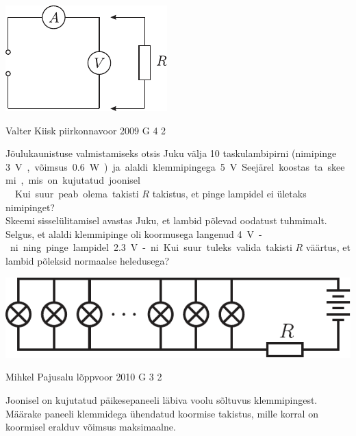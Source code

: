 \documentclass[11pt]{article}
\begin{document}
{{\begin{center}
	\includegraphics[width=0.5\linewidth]{2006-v3g-01-yl}
\end{center}
\fi
}

{Valter Kiisk} %
{piirkonnavoor} %
{2009} %
{G 4} %
{2} %
{
\ifStatement
Jõulukaunistuse valmistamiseks otsis Juku välja 10
taskulambipirni (nimipinge \SI{3}V, võimsus \SI{0.6}W) ja alaldi klemmipingega \SI{5}V.
Seejärel koostas ta skeemi, mis on kujutatud joonisel.\\
\osa Kui suur peab olema
takisti $R$ takistus, et pinge lampidel ei ületaks nimipinget?\\
\osa Skeemi sisselülitamisel avastas Juku, et lambid põlevad oodatust tuhmimalt. Selgus, et alaldi
klemmipinge oli koormusega langenud \SI{4}V-ni ning pinge lampidel \SI{2,3}V-ni. Kui suur
tuleks valida takisti $R$ väärtus, et lambid põleksid normaalse heledusega?

\begin{center}
	\includegraphics[width=0.8\linewidth]{2009-v2g-04-yl}
\end{center}
\fi
}

{Mihkel Pajusalu} %
{lõppvoor} %
{2010} %
{G 3} %
{2} %
{
\ifStatement
Joonisel on kujutatud päikesepaneeli läbiva voolu sõltuvus klemmipingest.
Määrake paneeli klemmidega ühendatud koormise takistus, mille korral on koormisel eralduv
võimsus maksimaalne.

}}
\end{document}
